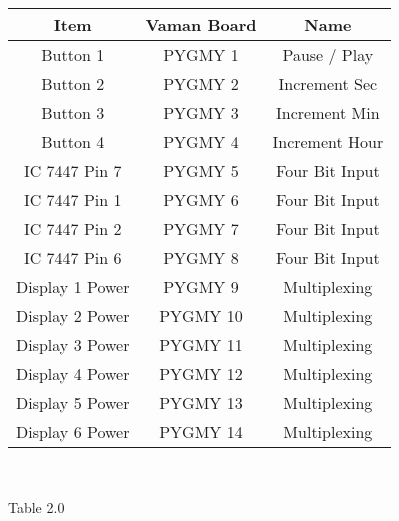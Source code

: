 \centering
\begin{tabular}{|c|c|c|}
\hline
Item & Vaman Board & Name\\
\hline
Button 1 & PYGMY 1 & Pause / Play\\
\hline
Button 2 & PYGMY 2 & Increment Sec\\
\hline
Button 3 & PYGMY 3 & Increment Min\\
\hline
Button 4 & PYGMY 4 & Increment Hour\\
\hline
IC 7447 Pin 7 & PYGMY 5 & Four Bit Input\\
\hline
IC 7447 Pin 1 & PYGMY 6 & Four Bit Input\\
\hline
IC 7447 Pin 2 & PYGMY 7 & Four Bit Input\\
\hline
IC 7447 Pin 6 & PYGMY 8 & Four Bit Input\\
\hline
Display 1 Power & PYGMY 9 & Multiplexing\\
\hline
Display 2 Power & PYGMY 10 & Multiplexing\\
\hline
Display 3 Power & PYGMY 11 & Multiplexing\\
\hline
Display 4 Power & PYGMY 12 & Multiplexing\\
\hline
Display 5 Power & PYGMY 13 & Multiplexing\\
\hline
Display 6 Power & PYGMY 14 & Multiplexing\\
\hline
\end{tabular}\\
\centerline{Table 2.0}
